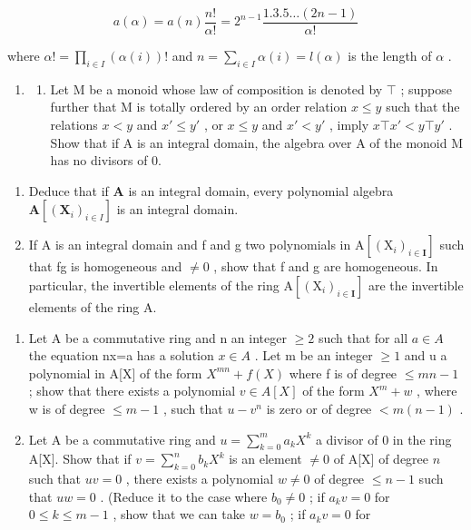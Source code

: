 \[
a (\alpha) = a (n) \frac {n !}{\alpha !} = 2 ^ {n - 1} \frac {1 . 3 . 5 \dots (2 n - 1)}{\alpha !}
\]

where \(\alpha! = \prod_{i \in I} (\alpha(i))!\) and \(n = \sum_{i \in I} \alpha(i) = l(\alpha)\) is the length of \(\alpha\) .

\begin{enumerate}
\def\labelenumi{\arabic{enumi}.}
\setcounter{enumi}{13}
\tightlist
\item
  \begin{enumerate}
  \def\labelenumii{(\alph{enumii})}
  \tightlist
  \item
    Let M be a monoid whose law of composition is denoted by \(\top\) ; suppose further that M is totally ordered by an order relation \(x \leqslant y\) such that the relations \(x < y\) and \(x' \leqslant y'\) , or \(x \leqslant y\) and \(x' < y'\) , imply \(x \top x' < y \top y'\) . Show that if A is an integral domain, the algebra over A of the monoid M has no divisors of 0.
  \end{enumerate}
\end{enumerate}

\begin{enumerate}
\def\labelenumi{(\alph{enumi})}
\setcounter{enumi}{1}
\item
  Deduce that if \(\mathbf{A}\) is an integral domain, every polynomial algebra \(\mathbf{A}[(\mathbf{X}_i)_{i\in I}]\) is an integral domain.
\item
  If A is an integral domain and f and g two polynomials in \(\mathrm{A}[(\mathrm{X}_{i})_{i\in\mathbf{I}}]\) such that fg is homogeneous and \(\neq0\) , show that f and g are homogeneous. In particular, the invertible elements of the ring \(\mathrm{A}[(\mathrm{X}_{i})_{i\in\mathbf{I}}]\) are the invertible elements of the ring A.
\end{enumerate}

\begin{enumerate}
\def\labelenumi{\arabic{enumi}.}
\setcounter{enumi}{14}
\item
  Let A be a commutative ring and n an integer \(\geqslant2\) such that for all \(a\in A\) the equation nx=a has a solution \(x\in A\) . Let m be an integer \(\geqslant1\) and u a polynomial in A{[}X{]} of the form \(X^{mn}+f(X)\) where f is of degree \(\leqslant mn-1\) ; show that there exists a polynomial \(v\in A[X]\) of the form \(X^{m}+w\) , where w is of degree \(\leqslant m-1\) , such that \(u-v^{n}\) is zero or of degree \(<m(n-1)\) .
\item
  Let A be a commutative ring and \(u = \sum_{k=0}^{m} a_k X^k\) a divisor of 0 in the ring A{[}X{]}. Show that if \(v = \sum_{k=0}^{n} b_k X^k\) is an element \(\neq 0\) of A{[}X{]} of degree \(n\) such that \(uv = 0\) , there exists a polynomial \(w \neq 0\) of degree \(\leqslant n - 1\) such that \(uw = 0\) . (Reduce it to the case where \(b_0 \neq 0\) ; if \(a_k v = 0\) for \(0 \leqslant k \leqslant m - 1\) , show that we can take \(w = b_0\) ; if \(a_k v = 0\) for
\end{enumerate}

